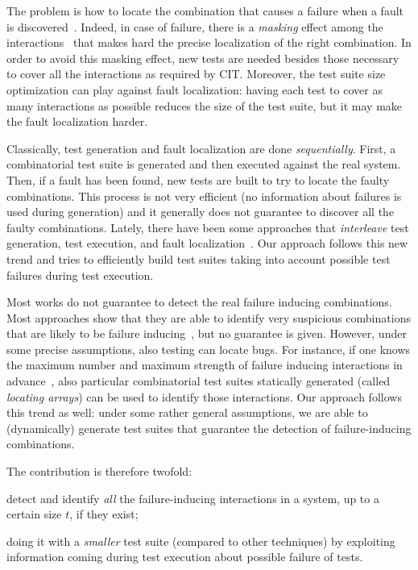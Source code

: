 \begin{tikzborder}{\cite{Gargantini16:validation}}
\begin{tikzborder}{\cite{gargantini_combinatorial_2017}}
\begin{tikzborder}{\cite{gargantini_combinatorial_2017}}
\begin{tikzborder}{\cite{garn2019}}
\begin{tikzborder}{\cite{arcaini2019achieving}}
The problem is how to locate the combination that causes a failure when a fault is discovered~\cite{Niu2018Identifying,Niu2018interleaving}. Indeed, in case of failure, there is a \emph{masking} effect among the interactions~\cite{Niu2018Identifying} that makes hard the precise localization of the right combination. In order to avoid this masking effect, new tests are needed besides those necessary to cover all the interactions as required by CIT. Moreover, the test suite size optimization can play against fault localization: having each test to cover as many interactions as possible reduces the size of the test suite, but it may make the fault localization harder.

Classically, test generation and fault localization are done \emph{sequentially}. First, a combinatorial test suite is generated and then executed against the real system. Then, if a fault has been found, new tests are built to try to locate the faulty combinations. This process is not very efficient (no information about failures is used during generation) and it generally does not guarantee to discover all the faulty combinations. Lately, there have been some approaches that \emph{interleave} test generation, test execution, and fault localization~\cite{Niu2018interleaving}. Our approach follows this new trend and tries to efficiently build test suites taking into account possible test failures during test execution.

Most works do not guarantee to detect the real failure inducing combinations. Most approaches show that they are able to identify very suspicious combinations that are likely to be failure inducing~\cite{ben_2015}, but no guarantee is given. However, under some precise assumptions, also testing can locate bugs. For instance, if one knows the maximum number and maximum strength of failure inducing interactions in advance~\cite{colbourn_locating_2008}, also particular combinatorial test suites statically generated (called {\it locating arrays}) can be used to identify those interactions. Our approach follows this trend as well: under some rather general assumptions, we are able to (dynamically) generate test suites that guarantee the detection of failure-inducing combinations.

The contribution is therefore twofold:
%
\begin{compactenum}
	\item detect and identify \textit{all} the failure-inducing interactions in a system, up to a certain size $t$, if they exist;
	\item doing it with a \textit{smaller} test suite (compared to other techniques) by exploiting information coming during test execution about possible failure of tests.
\end{compactenum}


\end{tikzborder}
\end{tikzborder}
\end{tikzborder}
\end{tikzborder}
\end{tikzborder}

